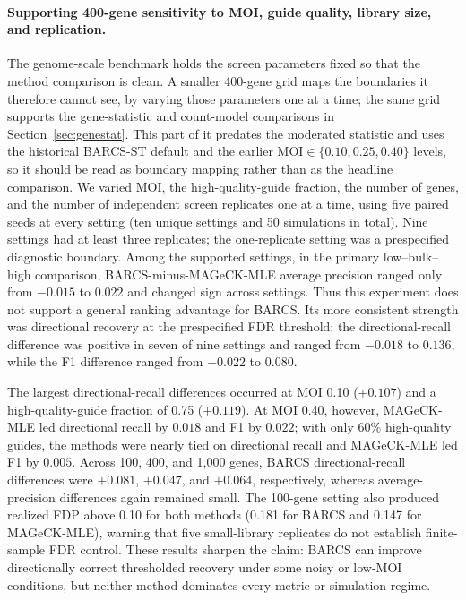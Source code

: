 \paragraph{Supporting 400-gene sensitivity to MOI, guide quality, library
size, and replication.}
The genome-scale benchmark holds the screen parameters fixed so that the
method comparison is clean.  A smaller 400-gene grid maps the boundaries it
therefore cannot see, by varying those parameters one at a time; the same grid
supports the gene-statistic and count-model comparisons in
Section~\ref{sec:genestat}.  This part of it predates the moderated statistic
and uses the historical BARCS-ST default and the earlier
$\mathrm{MOI}\in\{0.10,0.25,0.40\}$ levels, so it should be read as boundary
mapping rather than as the headline comparison.  We
varied MOI, the high-quality-guide fraction, the number of genes, and the
number of independent screen replicates one at a time, using five paired seeds
at every setting (ten unique settings and 50 simulations in total).  Nine
settings had at least three replicates; the one-replicate setting was a
prespecified diagnostic boundary.  Among the supported settings, in the
primary low--bulk--high comparison,
BARCS-minus-MAGeCK-MLE average precision ranged only from $-0.015$ to $0.022$
and changed sign across settings.  Thus this experiment does not support a
general ranking advantage for BARCS.  Its more consistent strength was
directional recovery at the prespecified FDR threshold: the directional-recall
difference was positive in seven of nine settings and ranged from $-0.018$ to
$0.136$, while the F1 difference ranged from $-0.022$ to $0.080$.

The largest directional-recall differences occurred at MOI 0.10
($+0.107$) and a high-quality-guide fraction of 0.75 ($+0.119$).  At MOI
0.40, however, MAGeCK-MLE led directional recall by $0.018$ and F1 by
$0.022$; with only 60\% high-quality guides, the methods were nearly tied on
directional recall and MAGeCK-MLE led F1 by $0.005$.  Across 100, 400, and
1,000 genes, BARCS directional-recall differences were $+0.081$, $+0.047$,
and $+0.064$, respectively, whereas average-precision differences again
remained small.  The 100-gene setting also produced realized FDP above 0.10
for both methods (0.181 for BARCS and 0.147 for MAGeCK-MLE), warning that five
small-library replicates do not establish finite-sample FDR control.  These
results sharpen the claim: BARCS can improve directionally correct thresholded
recovery under some noisy or low-MOI conditions, but neither method dominates
every metric or simulation regime.

